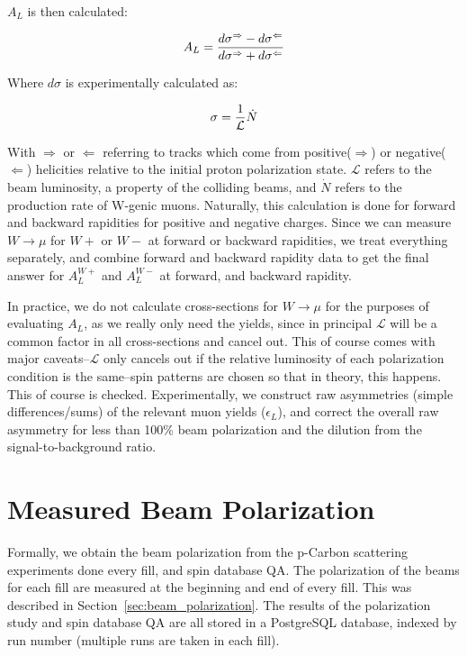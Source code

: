 $A_L$ is then calculated:

\begin{equation}
  A_L = {
    {d\sigma^{\Rightarrow} - d\sigma^{\Leftarrow}}
    \over
    {d\sigma^{\Rightarrow} + d\sigma^{\Leftarrow}}
  }
\end{equation}

Where $d\sigma$ is experimentally calculated as:

\begin{equation}
  \sigma = {1\over{\mathcal{L}}}{\dot{N}}
\end{equation}

With $\Rightarrow$ or $\Leftarrow$ referring to tracks which come from
positive($\Rightarrow$) or negative($\Leftarrow$) helicities relative to the
initial proton polarization state. $\mathcal{L}$ refers to the beam luminosity,
a property of the colliding beams, and $\dot{N}$ refers to the production rate
of W-genic muons. Naturally, this calculation is done for forward and backward
rapidities for positive and negative charges. Since we can measure
$W\rightarrow\mu$ for $W+$ or $W-$ at forward or backward rapidities, we treat
everything separately, and combine forward and backward rapidity data to get the
final answer for $A_L^{W+}$ and $A_L^{W-}$ at forward, and backward rapidity.

In practice, we do not calculate cross-sections for $W\rightarrow\mu$ for the
purposes of evaluating $A_L$, as we really only need the yields, since in
principal $\mathcal{L}$ will be a common factor in all cross-sections and cancel
out. This of course comes with major caveats--$\mathcal{L}$ only cancels out if
the relative luminosity of each polarization condition is the same--spin
patterns are chosen so that in theory, this happens. This of course is checked.
Experimentally, we construct raw asymmetries (simple differences/sums) of the
relevant muon yields ($\epsilon_{L}$), and correct the overall raw asymmetry for
less than 100\% beam polarization and the dilution from the signal-to-background
ratio.

\section{Measured Beam Polarization}
\label{sec:measured_beam_polarization}

Formally, we obtain the beam polarization from the p-Carbon scattering
experiments done every fill, and spin database QA. The polarization of the beams
for each fill are measured at the beginning and end of every fill. This was
described in Section~\ref{sec:beam_polarization}. The results of the
polarization study and spin database QA are all stored in a PostgreSQL database,
indexed by run number (multiple runs are taken in each fill).

